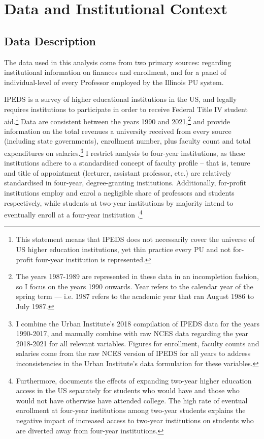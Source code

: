 \documentclass[notitlepage,12pt]{article}
\begin{document}
\section{Data and Institutional Context}
\label{sec:data}

\subsection{Data Description}
The data used in this analysis come from two primary sources: \citet[IPEDS]{ipeds} regarding institutional information on finances and enrollment, and \citet[IBHED]{ibhed} for a panel of individual-level of every Professor employed by the Illinois PU system.

IPEDS is a survey of higher educational institutions in the US, and legally requires institutions to participate in order to receive Federal Title IV student aid.\footnote{
    This statement means that IPEDS does not necessarily cover the universe of US higher education institutions, yet thin practice every PU and not for-profit four-year institution is represented.
}
Data are consistent between the years 1990 and 2021,\footnote{
    The years 1987-1989 are represented in these data in an incompletion fashion, so I focus on the years 1990 onwards.
    Year refers to the calendar year of the spring term --- i.e. 1987 refers to the academic year that ran August 1986 to July 1987.
}
and provide information on the total revenues a university received from every source (including state governments), enrollment number, plus faculty count and total expenditures on salaries.\footnote{
    I combine the Urban Institute's 2018 compilation of IPEDS data for the years 1990-2017, and manually combine with raw NCES data regarding the year 2018-2021 for all relevant variables.
    Figures for enrollment, faculty counts and salaries come from the raw NCES version of IPEDS for all years to address inconsistencies in the Urban Institute's data formulation for these variables.
}
I restrict analysis to four-year institutions, as these institutions adhere to a standardised concept of faculty profile -- that is, tenure and title of appointment (lecturer, assistant professor, etc.) are relatively standardised in four-year, degree-granting institutions.
Additionally, for-profit institutions employ and enrol a negligible share of professors and students respectively, while students at two-year institutions by majority intend to eventually enroll at a four-year institution \citep{mountjoy2022}.\footnote{
    Furthermore, \cite{mountjoy2022} documents the effects of expanding two-year higher education access in the US separately for students who would have and those who would not have otherwise have attended college.
    The high rate of eventual enrollment at four-year institutions among two-year students explains the negative impact of increased access to two-year institutions on students who are diverted away from four-year institutions.
}
\end{document}
